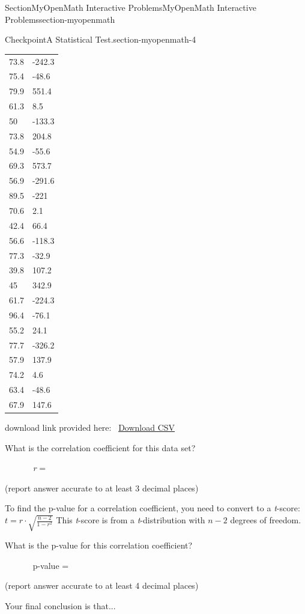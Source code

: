 \documentclass[twoside,10pt,]{article}
\numberwithin{equation}{section}
\begin{document}
\begin{sectionptx}{Section}{MyOpenMath Interactive Problems}{}{MyOpenMath Interactive Problems}{}{}{section-myopenmath}
\begin{inlineexercise}{Checkpoint}{A Statistical Test.}{section-myopenmath-4}
\begin{center}
{\begin{tabular}{ll}
73.8&-242.3\tabularnewline[0pt]
75.4&-48.6\tabularnewline[0pt]
79.9&551.4\tabularnewline[0pt]
61.3&8.5\tabularnewline[0pt]
50&-133.3\tabularnewline[0pt]
73.8&204.8\tabularnewline[0pt]
54.9&-55.6\tabularnewline[0pt]
69.3&573.7\tabularnewline[0pt]
56.9&-291.6\tabularnewline[0pt]
89.5&-221\tabularnewline[0pt]
70.6&2.1\tabularnewline[0pt]
42.4&66.4\tabularnewline[0pt]
56.6&-118.3\tabularnewline[0pt]
77.3&-32.9\tabularnewline[0pt]
39.8&107.2\tabularnewline[0pt]
45&342.9\tabularnewline[0pt]
61.7&-224.3\tabularnewline[0pt]
96.4&-76.1\tabularnewline[0pt]
55.2&24.1\tabularnewline[0pt]
77.7&-326.2\tabularnewline[0pt]
57.9&137.9\tabularnewline[0pt]
74.2&4.6\tabularnewline[0pt]
63.4&-48.6\tabularnewline[0pt]
67.9&147.6
\end{tabular}
}%
\end{center}%
download link provided here:  \href{denied:data:text/csv;charset=UTF-8,\%22x\%22\%2C\%22y\%22\%0A79.4\%2C-186.6\%0A92.2\%2C-186.3\%0A55.6\%2C88.3\%0A86.4\%2C-158.5\%0A48\%2C85.2\%0A63.2\%2C-399\%0A70.1\%2C-367.7\%0A58.6\%2C48.5\%0A63.4\%2C276.6\%0A42.8\%2C488.8\%0A67.4\%2C-128.4\%0A74.5\%2C-180.3\%0A43.6\%2C-38.7\%0A80.8\%2C427.3\%0A75.8\%2C350.8\%0A73.8\%2C-242.3\%0A75.4\%2C-48.6\%0A79.9\%2C551.4\%0A61.3\%2C8.5\%0A50\%2C-133.3\%0A73.8\%2C204.8\%0A54.9\%2C-55.6\%0A69.3\%2C573.7\%0A56.9\%2C-291.6\%0A89.5\%2C-221\%0A70.6\%2C2.1\%0A42.4\%2C66.4\%0A56.6\%2C-118.3\%0A77.3\%2C-32.9\%0A39.8\%2C107.2\%0A45\%2C342.9\%0A61.7\%2C-224.3\%0A96.4\%2C-76.1\%0A55.2\%2C24.1\%0A77.7\%2C-326.2\%0A57.9\%2C137.9\%0A74.2\%2C4.6\%0A63.4\%2C-48.6\%0A67.9\%2C147.6}{Download CSV}%
\par
What is the correlation coefficient for this data set?%
\par
       \emph{r} = %
\par
(report answer accurate to at least 3 decimal places)%
\par
To find the p-value for a correlation coefficient, you need to convert to a \emph{t}-score: \(\displaystyle{t}={r}\cdot\sqrt{{\frac{{{n}-{2}}}{{{1}-{r}^{{2}}}}}}\) This \emph{t}-score is from a \emph{t}-distribution with \(\displaystyle{n}-{2}\) degrees of freedom.%
\par
What is the p-value for this correlation coefficient?%
\par
       p-value = %
\par
(report answer accurate to at least 4 decimal places)%
\par
Your final conclusion is that...%
\par
%
\begin{enumerate}

\end{enumerate}
\end{inlineexercise}
\end{sectionptx}
\end{document}
